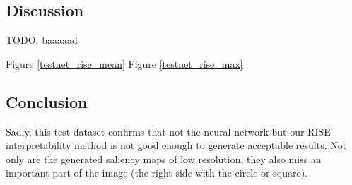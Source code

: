 \subsection{Discussion}
TODO: baaaaad

Figure \ref{testnet_rise_mean} Figure \ref{testnet_rise_max}

\subsection{Conclusion}
Sadly, this test dataset confirms that not the neural network but our RISE interpretability method is not good enough to generate acceptable results. Not only are the generated saliency maps of low resolution, they also miss an important part of the image (the right side with the circle or square).
